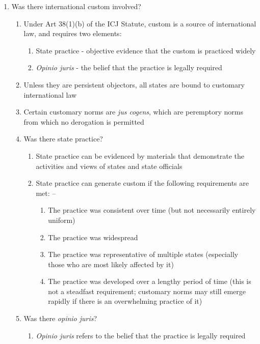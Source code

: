 \begin{enumerate}
\begin{enumerate}
    \end{enumerate}
    \item Was there international custom involved?
    \begin{enumerate}
        \item Under Art 38(1)(b) of the ICJ Statute, custom is a source of international law, and requires two elements:
        \begin{enumerate}
            \item State practice - objective evidence that the custom is practiced widely
            \item \textit{Opinio juris} - the belief that the practice is legally required
        \end{enumerate}
        \item Unless they are persistent objectors, all states are bound to customary international law
        \item Certain customary norms are \textit{jus cogens}, which are peremptory norms from which no derogation is permitted
        \item Was there state practice?
        \begin{enumerate}
            \item State practice can be evidenced by materials that demonstrate the activities and views of states and state officials
            \item State practice can generate custom if the following requirements are met: -- 
            \begin{enumerate}
                \item The practice was consistent over time (but not necessarily entirely uniform)
                \item The practice was widespread
                \item The practice was representative of multiple states (especially those who are most likely affected by it)
                \item The practice was developed over a lengthy period of time (this is not a steadfast requirement; customary norms may still emerge rapidly if there is an overwhelming practice of it)
            \end{enumerate}
        \end{enumerate}
        \item Was there \textit{opinio juris}?
        \begin{enumerate}
            \item \textit{Opinio juris} refers to the belief that the practice is legally required

\end{enumerate}
\end{enumerate}
\end{enumerate}
